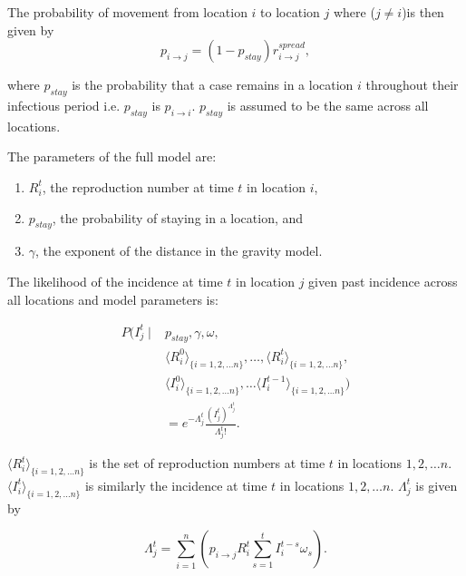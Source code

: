 \documentclass[9pt,twocolumn,twoside,lineno]{pnas-new}
\begin{document}
{The probability of movement from location \(i\) to location \(j\)
where ($j \neq i$)is
then given by 
\begin{equation*} 
p_{i \rightarrow j} = (1 - p_{stay}) r_{i \rightarrow j}^{spread},
\end{equation*}

where \(p_{stay}\) is the probability that a case remains in a location
\(i\) throughout their infectious period i.e. $p_{stay}$ is $p_{i
  \rightarrow i}$. \(p_{stay}\) is assumed to be
the same across all locations.

The parameters of the full model are:

\begin{enumerate}
\def\labelenumi{\arabic{enumi}.}
\item
  \(R_{i}^{t}\), the reproduction number at time \(t\) in location
  \(i\),
\item
  \(p_{stay}\), the probability of staying in a location, and
\item
  \(\gamma\), the exponent of the distance in the gravity model.
\end{enumerate}

The likelihood of the incidence at time \(t\) in location \(j\) given
past incidence across all locations and model parameters is:

\begin{equation*}
  \begin{aligned}
P ( 
I_{j}^{t} \mid 
& p_{stay}, \gamma, \omega, \\
& {\langle R_{i}^{0} \rangle}_{\{i = 1, 2, \dots n\}}, \hdots, {\langle R_{i}^{t} \rangle}_{\{i = 1, 2, \dots n\}}, \\
& {\langle I_{i}^{0} \rangle}_{\{i = 1, 2, \dots n\}}, \hdots {\langle I_{i}^{t-1} \rangle}_{\{i = 1, 2, \dots n\}} ) \\
& =  e^{-\Lambda_{j}^{t}}  \frac{ {\left( I_{j}^{t}\right)}^{\Lambda_{j}^{t}}}{\Lambda_{j}^{t} !}.
\end{aligned}
\end{equation*}

\({\langle R_{i}^{t} \rangle}_{\{i = 1, 2, \dots n\}}\) is the set of
reproduction numbers at time \(t\) in locations \(1, 2, \dots n\).
\({\langle I_{i}^{t} \rangle}_{\{i = 1, 2, \dots n\}}\) is similarly the
incidence at time \(t\) in locations \(1, 2, \dots
n\). \(\Lambda_{j}^{t}\) is given by

\begin{equation}
\Lambda_{j}^{t} = \sum\limits_{i = 1}^n{\left(p_{i \rightarrow j}R_{i}^{t} \sum_{s
        = 1}^t{I_{i}^{t - s} \omega_{s}} \right)}.
\label{eq:lambdajt}
\end{equation} 

}
\end{document}

